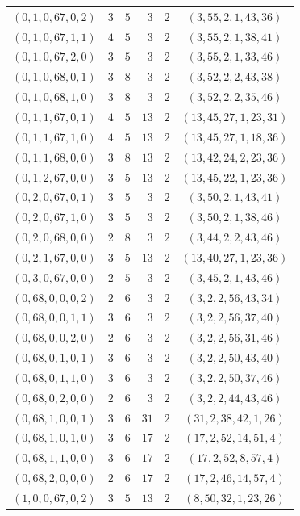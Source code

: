 \documentclass[11pt]{article}
\begin{document}
\begin{longtable}{crrrrc}
$(0,1,0,67,0,2)$ & $3$ & $5$ & $3$ & $2$ & $(3,55,2,1,43,36)$\\
$(0,1,0,67,1,1)$ & $4$ & $5$ & $3$ & $2$ & $(3,55,2,1,38,41)$\\
$(0,1,0,67,2,0)$ & $3$ & $5$ & $3$ & $2$ & $(3,55,2,1,33,46)$\\
$(0,1,0,68,0,1)$ & $3$ & $8$ & $3$ & $2$ & $(3,52,2,2,43,38)$\\
$(0,1,0,68,1,0)$ & $3$ & $8$ & $3$ & $2$ & $(3,52,2,2,35,46)$\\
$(0,1,1,67,0,1)$ & $4$ & $5$ & $13$ & $2$ & $(13,45,27,1,23,31)$\\
$(0,1,1,67,1,0)$ & $4$ & $5$ & $13$ & $2$ & $(13,45,27,1,18,36)$\\
$(0,1,1,68,0,0)$ & $3$ & $8$ & $13$ & $2$ & $(13,42,24,2,23,36)$\\
$(0,1,2,67,0,0)$ & $3$ & $5$ & $13$ & $2$ & $(13,45,22,1,23,36)$\\
$(0,2,0,67,0,1)$ & $3$ & $5$ & $3$ & $2$ & $(3,50,2,1,43,41)$\\
$(0,2,0,67,1,0)$ & $3$ & $5$ & $3$ & $2$ & $(3,50,2,1,38,46)$\\
$(0,2,0,68,0,0)$ & $2$ & $8$ & $3$ & $2$ & $(3,44,2,2,43,46)$\\
$(0,2,1,67,0,0)$ & $3$ & $5$ & $13$ & $2$ & $(13,40,27,1,23,36)$\\
$(0,3,0,67,0,0)$ & $2$ & $5$ & $3$ & $2$ & $(3,45,2,1,43,46)$\\
$(0,68,0,0,0,2)$ & $2$ & $6$ & $3$ & $2$ & $(3,2,2,56,43,34)$\\
$(0,68,0,0,1,1)$ & $3$ & $6$ & $3$ & $2$ & $(3,2,2,56,37,40)$\\
$(0,68,0,0,2,0)$ & $2$ & $6$ & $3$ & $2$ & $(3,2,2,56,31,46)$\\
$(0,68,0,1,0,1)$ & $3$ & $6$ & $3$ & $2$ & $(3,2,2,50,43,40)$\\
$(0,68,0,1,1,0)$ & $3$ & $6$ & $3$ & $2$ & $(3,2,2,50,37,46)$\\
$(0,68,0,2,0,0)$ & $2$ & $6$ & $3$ & $2$ & $(3,2,2,44,43,46)$\\
$(0,68,1,0,0,1)$ & $3$ & $6$ & $31$ & $2$ & $(31,2,38,42,1,26)$\\
$(0,68,1,0,1,0)$ & $3$ & $6$ & $17$ & $2$ & $(17,2,52,14,51,4)$\\
$(0,68,1,1,0,0)$ & $3$ & $6$ & $17$ & $2$ & $(17,2,52,8,57,4)$\\
$(0,68,2,0,0,0)$ & $2$ & $6$ & $17$ & $2$ & $(17,2,46,14,57,4)$\\
$(1,0,0,67,0,2)$ & $3$ & $5$ & $13$ & $2$ & $(8,50,32,1,23,26)$\\

\end{longtable}
\end{document}

